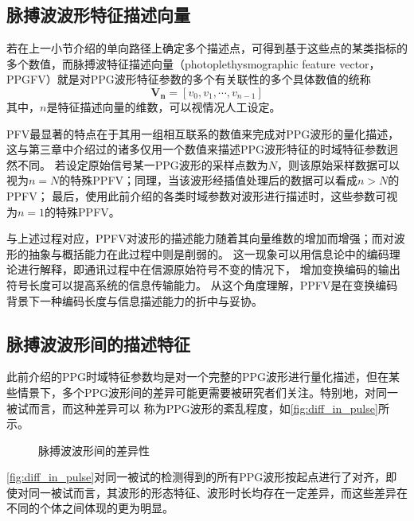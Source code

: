\subsection{脉搏波波形特征描述向量}

若在上一小节介绍的单向路径上确定多个描述点，可得到基于这些点的某类指标的多个数值，而脉搏波特征描述向量（photoplethysmographic feature vector，PPGFV）就是对PPG波形特征参数的多个有关联性的多个具体数值的统称
\begin{equation}
  \label{equ:featurevector}
  \boldsymbol {V_n}=[v_0,v_1,\cdots,v_{n-1}]
\end{equation}
其中，$n$是特征描述向量的维数，可以视情况人工设定。

PFV最显著的特点在于其用一组相互联系的数值来完成对PPG波形的量化描述，这与第三章中介绍过的诸多仅用一个数值来描述PPG波形特征的时域特征参数迥然不同。
若设定原始信号某一PPG波形的采样点数为$N$，则该原始采样数据可以视为$n=N$的特殊PPFV；同理，当该波形经插值处理后的数据可以看成$n>N$的PPFV；
最后，使用此前介绍的各类时域参数对波形进行描述时，这些参数可视为$n=1$的特殊PPFV。

与上述过程对应，PPFV对波形的描述能力随着其向量维数的增加而增强；而对波形的抽象与概括能力在此过程中则是削弱的。
这一现象可以用信息论中的编码理论进行解释，即通讯过程中在信源原始符号不变的情况下，
增加变换编码的输出符号长度可以提高系统的信息传输能力\cite{Zhao2017}。
从这个角度理解，PPFV是在变换编码背景下一种编码长度与信息描述能力的折中与妥协。

\subsection{脉搏波波形间的描述特征}
此前介绍的PPG时域特征参数均是对一个完整的PPG波形进行量化描述，但在某些情景下，多个PPG波形间的差异可能更需要被研究者们关注。特别地，对同一被试而言，而这种差异可以
称为PPG波形的紊乱程度，如\autoref{fig:diff_in_pulse}所示。

\begin{figure}[htbp]
  \centering
  \quad
  \caption[脉搏波波形间的差异性]{\label{fig:diff_in_pulse}脉搏波波形间的差异性}
\end{figure}

\autoref{fig:diff_in_pulse}对同一被试的检测得到的所有PPG波形按起点进行了对齐，即使对同一被试而言，其波形的形态特征、波形时长均存在一定差异，而这些差异在不同的个体之间体现的更为明显。

